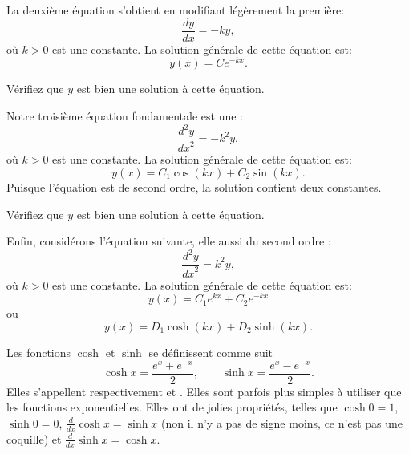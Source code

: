 La deuxième équation s'obtient en modifiant légèrement la première: 
\begin{equation*}
	\frac{dy}{dx} = -k y, 
\end{equation*}
où $k > 0$ est une constante. La solution générale de cette équation est: 
\begin{equation*}
	y(x) = C e^{-kx}.
\end{equation*}

\begin{exercise}
	Vérifiez que $y$ est bien une solution à cette équation.
\end{exercise}

Notre troisième équation fondamentale est une 
\emph{}: 
\begin{equation*}
	\frac{d^2y}{{dx}^2} = -k^2 y, 
\end{equation*}
où $k > 0$ est une constante. La solution générale de cette équation est: 
\begin{equation*}
	y(x) = C_1 \cos(kx) + C_2 \sin(kx).
\end{equation*}
Puisque l'équation est de second ordre, la solution contient deux constantes.

\begin{exercise}
	Vérifiez que $y$ est bien une solution à cette équation.
\end{exercise}

Enfin, considérons l'équation suivante, elle aussi du second ordre : 
\begin{equation*}
	\frac{d^2y}{{dx}^2} = k^2 y, 
\end{equation*}
où $k > 0$ est une constante. La solution générale de cette équation est: 
\begin{equation*}
	y(x) = C_1 e^{kx} + C_2 e^{-kx} 
\end{equation*}
ou
\begin{equation*}
	y(x) = D_1 \cosh(kx) + D_2 \sinh(kx) .
\end{equation*}

Les fonctions $\cosh$ et $\sinh$ se définissent comme suit
\begin{equation*}
	\cosh x = \frac{e^{x} + e^{-x}}{2} , \qquad
	\sinh x = \frac{e^{x} - e^{-x}}{2} .
\end{equation*}
Elles s'appellent respectivement \emph{}
et \emph{}.
Elles sont parfois plus simples à utiliser que les fonctions exponentielles.  Elles ont de jolies propriétés, telles que
$\cosh 0 = 1$, $\sinh 0 = 0$, $\frac{d}{dx} \cosh x = \sinh x$ 
(non il n'y a pas de signe moins, ce n'est pas une coquille)
et $\frac{d}{dx} \sinh x = \cosh x$.

